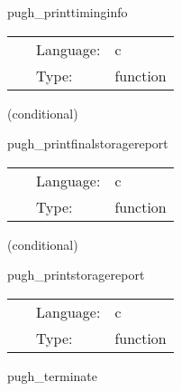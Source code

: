 \documentclass{article}
\begin{document}
\hspace{5mm} pugh\_printtiminginfo 

\hspace{5mm}{\it print time spent in communication } 


\hspace{5mm}

 \begin{tabular*}{160mm}{cll} 
~ & Language:  & c \\ 
~ & Type:  & function \\ 
\end{tabular*} 


\vspace{5mm}

   (conditional) 

\hspace{5mm} pugh\_printfinalstoragereport 

\hspace{5mm}{\it print storage information } 


\hspace{5mm}

 \begin{tabular*}{160mm}{cll} 
~ & Language:  & c \\ 
~ & Type:  & function \\ 
\end{tabular*} 


\vspace{5mm}

   (conditional) 

\hspace{5mm} pugh\_printstoragereport 

\hspace{5mm}{\it print storage information } 


\hspace{5mm}

 \begin{tabular*}{160mm}{cll} 
~ & Language:  & c \\ 
~ & Type:  & function \\ 
\end{tabular*} 


\vspace{5mm}


\hspace{5mm} pugh\_terminate 

\hspace{5mm}{\it termination routine } 
\end{document}
